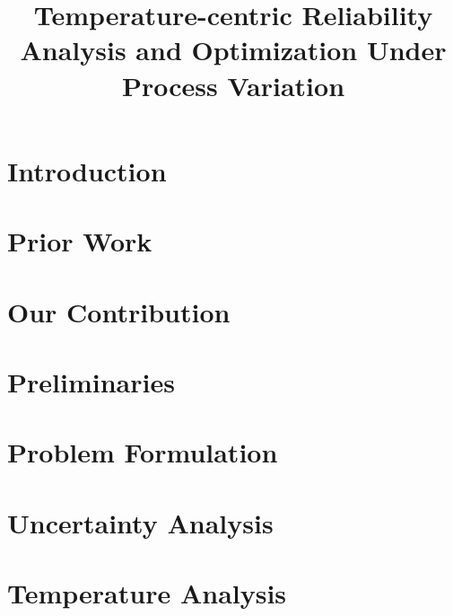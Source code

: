 \documentclass[conference]{IEEEtran}
\begin{document}
  \title{Temperature-centric Reliability Analysis and Optimization Under Process Variation}

  \author{
    
  }

  \maketitle

  \begin{abstract}
    
  \end{abstract}

  \section{Introduction} 
  

  \section{Prior Work} 
  

  \section{Our Contribution} 
  

  \section{Preliminaries} 
  

  \section{Problem Formulation} 
  

  \section{Uncertainty Analysis} 
  

  \section{Temperature Analysis} 
  
\end{document}
